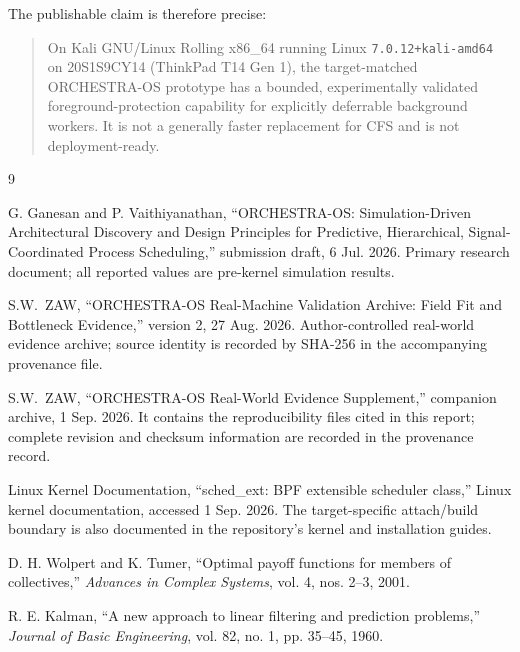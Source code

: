 \documentclass[10pt,letterpaper,twocolumn]{article}
\newcommand{\hostid}{20S1S9CY14 (ThinkPad T14 Gen 1)}
\newcommand{\AUTHOR}{S.W.\ ZAW}
\begin{document}
The publishable claim is therefore precise:

\begin{samepage}
\begin{quote}\small
On Kali GNU/Linux Rolling x86\_64 running Linux \texttt{7.0.12+kali-amd64} on \hostid, the target-matched ORCHESTRA-OS prototype has a bounded, experimentally validated foreground-protection capability for explicitly deferrable background workers. It is not a generally faster replacement for CFS and is not deployment-ready.
\end{quote}
\end{samepage}

\balance
\begin{thebibliography}{9}
\footnotesize

G. Ganesan and P. Vaithiyanathan, ``ORCHESTRA-OS: Simulation-Driven Architectural Discovery and Design Principles for Predictive, Hierarchical, Signal-Coordinated Process Scheduling,'' submission draft, 6 Jul. 2026. Primary research document; all reported values are pre-kernel simulation results.

\AUTHOR, ``ORCHESTRA-OS Real-Machine Validation Archive: Field Fit and Bottleneck Evidence,'' version 2, 27 Aug. 2026. Author-controlled real-world evidence archive; source identity is recorded by SHA-256 in the accompanying provenance file.

\AUTHOR, ``ORCHESTRA-OS Real-World Evidence Supplement,'' companion archive, 1 Sep. 2026. It contains the reproducibility files cited in this report; complete revision and checksum information are recorded in the provenance record.

Linux Kernel Documentation, ``sched\_ext: BPF extensible scheduler class,'' Linux kernel documentation, accessed 1 Sep. 2026. The target-specific attach/build boundary is also documented in the repository's kernel and installation guides.

D. H. Wolpert and K. Tumer, ``Optimal payoff functions for members of collectives,'' \textit{Advances in Complex Systems}, vol. 4, nos. 2--3, 2001.

R. E. Kalman, ``A new approach to linear filtering and prediction problems,'' \textit{Journal of Basic Engineering}, vol. 82, no. 1, pp. 35--45, 1960.

\end{thebibliography}
\end{document}
